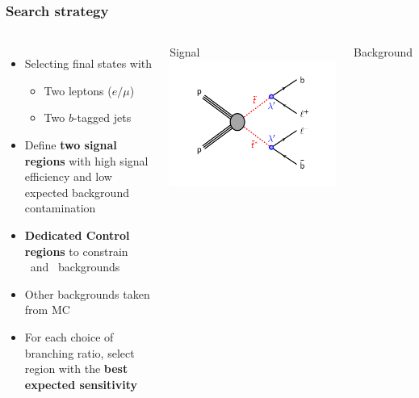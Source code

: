 \documentclass[10pt, svgnames]{beamer}
\begin{document}
\begin{frame}
  \frametitle{Search strategy}
  \begin{columns}
    \begin{itemize}
      \item Selecting final states with
        \begin{itemize}
          \item {\color{nice_blue}Two leptons} ($e/\mu$)
          \item {\color{nice_red}Two $b$-tagged jets}
        \end{itemize}
      \item Define {\color{nice_blue}\textbf{two signal regions}} with high signal
        efficiency and low expected background contamination
      \item \textbf{\color{nice_red} Dedicated Control regions} to constrain
        \TTBAR\ and \ZGAMMA\ backgrounds
      \item Other backgrounds taken from MC
      \item For each choice of branching ratio, select region with the
        {\color{nice_blue} \textbf{best expected sensitivity}}
    \end{itemize}
    \begin{block}{Signal}
      \includegraphics[width=\textwidth]{figures/b_minus_l_stop_stop.pdf}
    \end{block}
    \begin{block}{Background}

\end{block}
\end{columns}
\end{frame}
\end{document}
